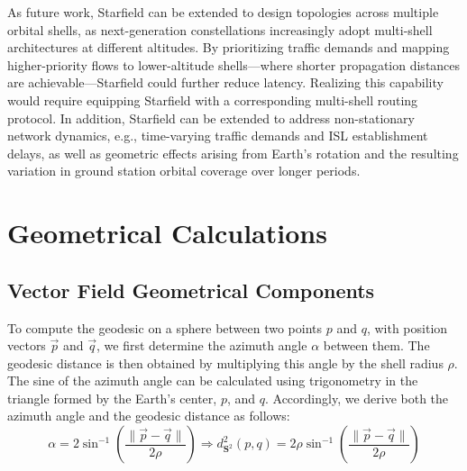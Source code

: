\documentclass[acmsmall, screen]{acmart}
\begin{document}
As future work, Starfield can be extended to design topologies across multiple orbital shells, as next-generation constellations increasingly adopt multi-shell architectures at different altitudes. By prioritizing traffic demands and mapping higher-priority flows to lower-altitude shells—where shorter propagation distances are achievable—Starfield could further reduce latency. Realizing this capability would require equipping Starfield with a corresponding multi-shell routing protocol. In addition, Starfield can be extended to address non-stationary network dynamics, e.g., time-varying traffic demands and ISL establishment delays, as well as geometric effects arising from Earth’s rotation and the resulting variation in ground station orbital coverage over longer periods.



\appendix

\section{Geometrical Calculations}\label{appendix:geomCalc}
\subsection{Vector Field Geometrical Components}\label{appendix:geomCalc:field}
To compute the geodesic on a sphere between two points $p$ and $q$, with position vectors $\vec{p}$ and $\vec{q}$, we first determine the azimuth angle $\alpha$ between them. The geodesic distance is then obtained by multiplying this angle by the shell radius $\rho$. The sine of the azimuth angle can be calculated using trigonometry in the triangle formed by the Earth’s center, $p$, and $q$. Accordingly, we derive both the azimuth angle and the geodesic distance as follows:
\begin{equation}\label{appendix:geomCalc:field:geodesic}
    \alpha = 2\sin^{-1}{\left(\frac{\|\vec{p} - \vec{q}\|}{2\rho}\right)} \Longrightarrow d^2_{\mathbf{S}^2}(p,q) = 2\rho\sin^{-1}{\left(\frac{\|\vec{p} - \vec{q}\|}{2\rho}\right)}
\end{equation}
\end{document}
